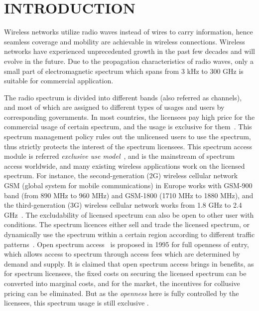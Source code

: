 \chapter{INTRODUCTION}
Wireless networks utilize radio waves instead of wires to carry information, hence seamless coverage and mobility are achievable in wireless connections.
Wireless networks have experienced unprecedented growth in the past few decades and will evolve in the future.
Due to the propagation characteristics of radio waves, only a small part of electromagnetic spectrum which spans from 3 kHz to 300 GHz is suitable for commercial application.
 
The radio spectrum is divided into different bands (also referred as channels), and most of which are assigned to different types of usages and users by corresponding governments.
In most countries, the licensees pay high price for the commercial usage of certain spectrum, and the usage is exclusive for them~\cite{Spectrum_Management07}.
This spectrum management policy rules out the unlicensed users to use the spectrum, thus strictly protects the interest of the spectrum licensees.
This spectrum access module is referred \textit{exclusive use model}~\cite{zhao_survey_DSA_2007}, and is the mainstream of spectrum access worldwide, and many existing wireless applications work on the licensed spectrum.
For instance, the second-generation (2G) wireless cellular network GSM (global system for mobile communications) in Europe works with GSM-900 band (from 890 MHz to 960 MHz) and GSM-1800 (1710 MHz to 1880 MHz), and the third-generation (3G) wireless cellular network works from 1.8 GHz to 2.4 GHz~\cite{wireless_communicatioins2001}.
The excludability of licensed spectrum can also be open to other user with conditions.
The spectrum licences either sell and trade the licensed spectrum, or dynamically use the spectrum within a certain region according to different traffic patterns~\cite{dsa_traffic_2000}.
Open spectrum access~\cite{osa_Noam_1995} is proposed in 1995 for full openness of entry, which allows access to spectrum through access fees which are determined by demand and supply.
It is claimed that open spectrum access brings in benefits, as for spectrum licensees, the fixed costs on securing the licensed spectrum can be converted into marginal costs, and for the market, the incentives for collusive pricing can be eliminated.
But as the \textit{openness} here is fully controlled by the licensees, this spectrum usage is still exclusive .

